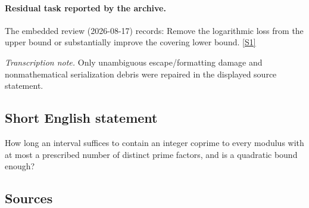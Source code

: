 \documentclass[11pt,a4paper]{article}
\newcommand{\sref}[2]{\hyperlink{source:#1:#2}{[S#2]}}
\begin{document}
\paragraph{Residual task reported by the archive.}

The embedded review (2026-08-17) records: Remove the logarithmic loss from the upper bound or substantially improve the covering lower bound. \sref{2416}{1}

{\small\emph{Transcription note.} Only unambiguous escape/formatting damage and nonmathematical serialization debris were repaired in the displayed source statement.}

\subsection{Short English statement}

How long an interval suffices to contain an integer coprime to every modulus with at most a prescribed number of distinct prime factors, and is a quadratic bound enough?

\subsection{Sources}
\end{document}

